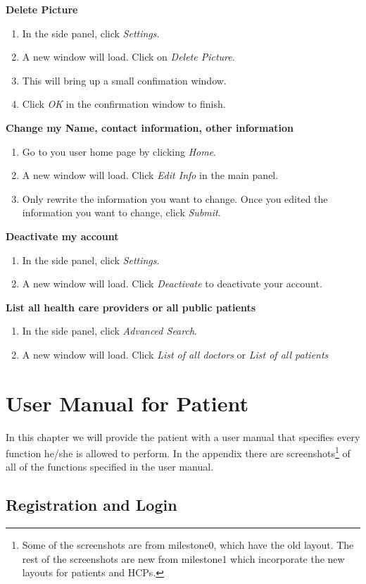 \textbf{Delete Picture}
\begin{enumerate}
\item In the side panel, click \textit{Settings}.
\item A new window will load. Click on \textit{Delete Picture}.
\item This will bring up a small confimation window.
\item Click \textit{OK} in the confirmation window to finish.
\end{enumerate}
\textbf{Change my Name, contact information, other information}
\begin{enumerate}
\item Go to you user home page by clicking \textit{Home}.
\item A new window will load. Click \textit{Edit Info} in the main panel.
\item Only rewrite the information you want to change. Once you edited the information you want to change, click \textit{Submit}.
\end{enumerate}
\textbf{Deactivate my account}
\begin{enumerate}
\item In the side panel, click \textit{Settings}.
\item A new window will load. Click \textit{Deactivate} to deactivate your account.
\end{enumerate}
\textbf{List all health care providers or all public patients}
\begin{enumerate}
\item In the side panel, click \textit{Advanced Search}.
\item A new window will load. Click \textit{List of all doctors} or \textit{List of all patients}
\end{enumerate}

\chapter{User Manual for Patient}

In this chapter we will provide the patient with a user manual that specifies every function he/she is allowed to perform.  In the appendix there are screenshots\footnote{Some of the screenshots are from milestone0, which have the old layout. The rest of the screenshots are new from milestone1 which incorporate the new layouts for patients and HCPs.} of all of the functions specified in the user manual.

\section{Registration and Login}

